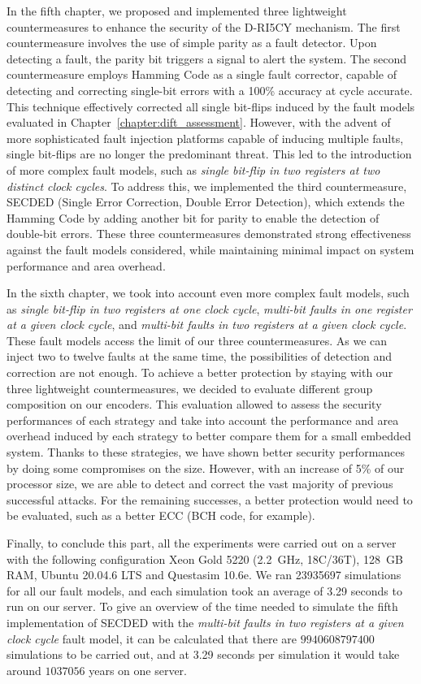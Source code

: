 In the fifth chapter, we proposed and implemented three lightweight countermeasures to enhance the security of the D-RI5CY mechanism. The first countermeasure involves the use of simple parity as a fault detector. Upon detecting a fault, the parity bit triggers a signal to alert the system. The second countermeasure employs Hamming Code as a single fault corrector, capable of detecting and correcting single-bit errors with a 100\% accuracy at cycle accurate. This technique effectively corrected all single bit-flips induced by the fault models evaluated in Chapter~\ref{chapter:dift_assessment}. However, with the advent of more sophisticated fault injection platforms capable of inducing multiple faults, single bit-flips are no longer the predominant threat. This led to the introduction of more complex fault models, such as \textit{single bit-flip in two registers at two distinct clock cycles}. To address this, we implemented the third countermeasure, SECDED (Single Error Correction, Double Error Detection), which extends the Hamming Code by adding another bit for parity to enable the detection of double-bit errors. These three countermeasures demonstrated strong effectiveness against the fault models considered, while maintaining minimal impact on system performance and area overhead.

In the sixth chapter, we took into account even more complex fault models, such as \textit{single bit-flip in two registers at one clock cycle}, \textit{multi-bit faults in one register at a given clock cycle}, and \textit{multi-bit faults in two registers at a given clock cycle}. These fault models access the limit of our three countermeasures. As we can inject two to twelve faults at the same time, the possibilities of detection and correction are not enough. To achieve a better protection by staying with our three lightweight countermeasures, we decided to evaluate different group composition on our encoders. This evaluation allowed to assess the security performances of each strategy and take into account the performance and area overhead induced by each strategy to better compare them for a small embedded system. Thanks to these strategies, we have shown better security performances by doing some compromises on the size. However, with an increase of 5\% of our processor size, we are able to detect and correct the vast majority of previous successful attacks. For the remaining successes, a better protection would need to be evaluated, such as a better ECC (BCH code, for example).

Finally, to conclude this part, all the experiments were carried out on a server with the following configuration Xeon Gold 5220 (2.2~GHz, 18C/36T), 128~GB RAM, Ubuntu 20.04.6 LTS and Questasim 10.6e. We ran \num{23935697} simulations for all our fault models, and each simulation took an average of 3.29 seconds to run on our server. To give an overview of the time needed to simulate the fifth implementation of SECDED with the \textit{multi-bit faults in two registers at a given clock cycle} fault model, it can be calculated that there are $\num{9940608797400}$ simulations to be carried out, and at 3.29 seconds per simulation it would take around $\num{1037056}$ years on one server.

